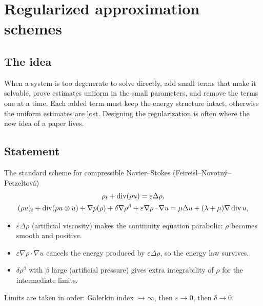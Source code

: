 
\section{Regularized approximation schemes}\label{p:regularized-approximation}


\subsection*{The idea}

When a system is too degenerate to solve directly, add small terms that make it solvable, prove estimates uniform in the small parameters, and remove the terms one at a time. Each added term must keep the energy structure intact, otherwise the uniform estimates are lost. Designing the regularization is often where the new idea of a paper lives.

\subsection*{Statement}

\begin{thmbox}{The standard scheme for compressible Navier--Stokes (Feireisl--Novotný--Petzeltová)}
%
\[
      \begin{gathered}
      \rho_t+\operatorname{div}(\rho u)=\varepsilon\Delta\rho,\\
      (\rho u)_t+\operatorname{div}(\rho u\otimes u)+\nabla p(\rho)+\delta\nabla\rho^\beta+\varepsilon\nabla\rho\cdot\nabla u
       =\mu\Delta u+(\lambda+\mu)\nabla\operatorname{div} u,
      \end{gathered}
    \]

\begin{itemize}
\item $\varepsilon\Delta\rho$ (artificial viscosity) makes the continuity equation parabolic: $\rho$ becomes smooth and positive.
\item $\varepsilon\nabla\rho\cdot\nabla u$ cancels the energy produced by $\varepsilon\Delta\rho$, so the energy law survives.
\item $\delta\rho^\beta$ with $\beta$ large (artificial pressure) gives extra integrability of $\rho$ for the intermediate limits.
\end{itemize}

Limits are taken in order: Galerkin index $\to\infty$, then $\varepsilon\to0$, then $\delta\to0$.
\end{thmbox}

